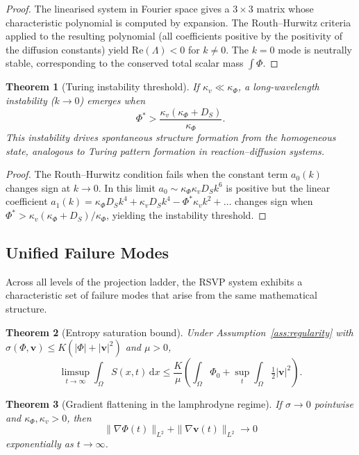 \documentclass[12pt, a4paper]{article}
\theoremstyle{plain}
\newtheorem{theorem}{Theorem}[section]
\theoremstyle{definition}
\theoremstyle{remark}
\newcommand{\vfield}{\mathbf{v}}
\begin{document}
\begin{proof}
The linearised system in Fourier space gives a $3\times 3$ matrix whose characteristic
polynomial is computed by expansion.  The Routh--Hurwitz criteria applied to the resulting
polynomial (all coefficients positive by the positivity of the diffusion constants) yield
$\mathrm{Re}(\Lambda) < 0$ for $k \neq 0$.  The $k = 0$ mode is neutrally stable,
corresponding to the conserved total scalar mass $\int\Phi$.
\end{proof}

\begin{theorem}[Turing instability threshold]
\label{thm:turing}
If $\kappa_v \ll \kappa_\Phi$, a long-wavelength instability ($k \to 0$) emerges when
\[
\Phi^* > \frac{\kappa_v(\kappa_\Phi + D_S)}{\kappa_\Phi}.
\]
This instability drives spontaneous structure formation from the homogeneous state,
analogous to Turing pattern formation in reaction--diffusion systems.
\end{theorem}

\begin{proof}
The Routh--Hurwitz condition fails when the constant term $a_0(k)$ changes sign at $k \to 0$.
In this limit $a_0 \sim \kappa_\Phi\kappa_v D_S k^6$ is positive but the linear coefficient
$a_1(k) = \kappa_\Phi D_S k^4 + \kappa_v D_S k^4 - \Phi^*\kappa_v k^2 + \ldots$
changes sign when $\Phi^* > \kappa_v(\kappa_\Phi + D_S)/\kappa_\Phi$, yielding the
instability threshold.
\end{proof}

\subsection{Unified Failure Modes}

Across all levels of the projection ladder, the RSVP system exhibits a characteristic
set of failure modes that arise from the same mathematical structure.

\begin{theorem}[Entropy saturation bound]
\label{thm:saturation}
Under Assumption~\ref{ass:regularity} with $\sigma(\Phi,\vfield) \leq K(|\Phi| + |\vfield|^2)$
and $\mu > 0$,
\[
\limsup_{t\to\infty}\int_\Omega S(x,t)\,\mathrm{d}x
\leq \frac{K}{\mu}\!\left(\int_\Omega\Phi_0 + \sup_t\int_\Omega\tfrac{1}{2}|\vfield|^2\right).
\]
\end{theorem}

\begin{theorem}[Gradient flattening in the lamphrodyne regime]
If $\sigma \to 0$ pointwise and $\kappa_\Phi, \kappa_v > 0$, then
\[
\|\nabla\Phi(t)\|_{L^2} + \|\nabla\vfield(t)\|_{L^2} \to 0
\]
exponentially as $t\to\infty$.
\end{theorem}
\end{document}
